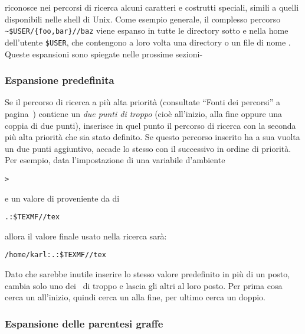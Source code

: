\documentclass{article}
\begin{document}
\KPS{} riconosce nei percorsi di ricerca alcuni caratteri e costrutti
speciali, simili a quelli disponibili nelle shell di Unix. Come esempio
generale, il complesso percorso \verb+~$USER/{foo,bar}//baz+ viene espanso
in tutte le directory sotto  e  nella home dell'utente
\texttt{\$USER}, che contengono a loro volta una directory o un file di
nome . Queste espansioni sono spiegate nelle prossime sezioni-
\subsubsection{Espansione predefinita}
\label{sec:default-expansion}

Se il percorso di ricerca a più alta priorità (consultate ``Fonti dei
percorsi'' a pagina~\pageref{sec:path-sources}) contiene un \emph{due
punti di troppo} (cioè all'inizio, alla fine oppure una coppia di due
punti), \KPS{} inserisce in quel punto il percorso di ricerca con la
seconda più alta priorità che sia stato definito. Se questo percorso
inserito ha a sua vuolta un due punti aggiuntivo, accade lo stesso con il
successivo in ordine di priorità. Per esempio, data l'impostazione di una
variabile d'ambiente

\begin{alltt}
> 
\end{alltt}
e un valore di  proveniente da  di

\begin{alltt}
  .:\$TEXMF//tex
\end{alltt}
allora il valore finale usato nella ricerca sarà:

\begin{alltt}
  /home/karl:.:\$TEXMF//tex
\end{alltt}

Dato che sarebbe inutile inserire lo stesso valore predefinito in più di
un posto, \KPS{} cambia solo uno dei \samp{:}\ di troppo e lascia gli
altri al loro posto. Per prima cosa cerca un \samp{:} all'inizio, quindi
cerca un \samp{:} alla fine, per ultimo cerca un \samp{:} doppio.

\subsubsection{Espansione delle parentesi graffe}
\label{sec:brace-expansion}
\end{document}
